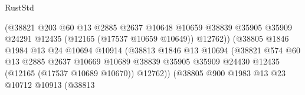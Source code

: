 \begin{lexlean}{RustStd}
\begin{coremodule}
                                            (@38821
                                              @203
                                              @60
                                              @13
                                              @2885
                                              @2637
                                              @10648
                                              @10659
                                              @38839
                                              @35905
                                              @35909
                                              @24291
                                              @12435
                                              (@12165 (@17537 @10659 @10649))
                                              @12762))
                                          (@38805
                                            @1846
                                            @1984
                                            @13
                                            @24
                                            @10694
                                            @10914
                                            (@38813
                                              @1846
                                              @13
                                              @10694
                                              (@38821
                                                @574
                                                @60
                                                @13
                                                @2885
                                                @2637
                                                @10669
                                                @10689
                                                @38839
                                                @35905
                                                @35909
                                                @24430
                                                @12435
                                                (@12165 (@17537 @10689 @10670))
                                                @12762))
                                            (@38805
                                              @900
                                              @1983
                                              @13
                                              @23
                                              @10712
                                              @10913
                                              (@38813

\end{coremodule}
\end{lexlean}
